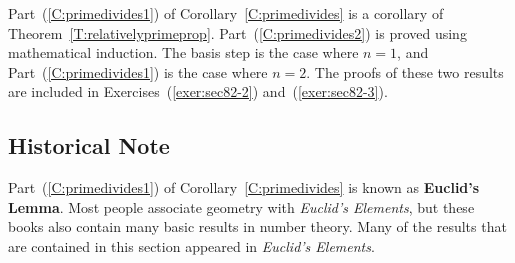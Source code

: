 Part~(\ref{C:primedivides1}) of Corollary~\ref{C:primedivides} is a corollary of Theorem~\ref{T:relativelyprimeprop}.  Part~(\ref{C:primedivides2}) is proved using mathematical induction.  The basis step is the case where  $n = 1$, and Part~(\ref{C:primedivides1}) is the case where  
$n = 2$.  The proofs of these two results are included in Exercises~(\ref{exer:sec82-2}) 
and~(\ref{exer:sec82-3}).
%
\hbreak
%
\subsection*{Historical Note}

Part~(\ref{C:primedivides1}) of Corollary~\ref{C:primedivides} is known as  \textbf{Euclid's Lemma}.
%
  Most people associate geometry with \textit{Euclid's Elements}, but these books  also contain many basic results in number theory.  Many of the results that are contained in this section appeared in \textit{Euclid's Elements}.
%
\hbreak

\endinput
